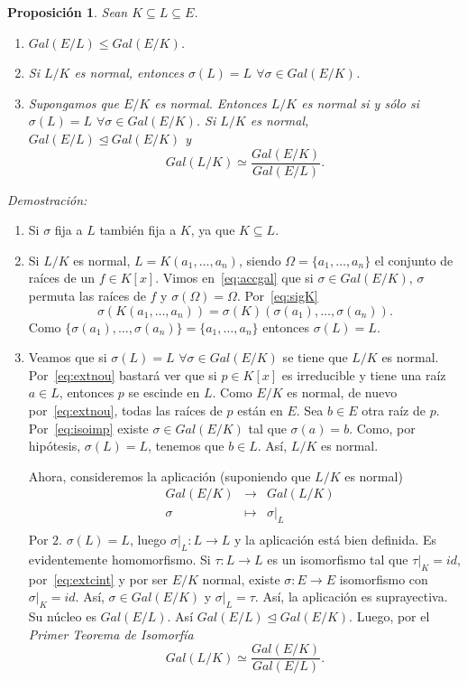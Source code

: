 \documentclass[12pt]{article}
\newtheorem{proposition}[theorem]{Proposición}
\begin{document}
\begin{proposition}\label{eq:preGal0} Sean $K \subseteq L \subseteq E$. \begin{enumerate}
\item $Gal(E/L) \leq Gal(E/K)$.
\item Si $L/K$ es normal, entonces $\sigma (L) = L$ $\forall \sigma \in Gal(E/K)$.
\item Supongamos que $E/K$ es normal. Entonces $L/K$ es normal si y sólo si $\sigma (L) = L$ $\forall \sigma \in Gal(E/K)$. Si $L/K$ es normal, $Gal(E/L) \unlhd Gal(E/K)$ y $$Gal(L/K) \simeq \dfrac{Gal(E/K)}{Gal(E/L)}.$$
\end{enumerate}
\end{proposition}
\emph{Demostración: }\begin{enumerate}
\item Si $\sigma$ fija a $L$ también fija a $K$, ya que $K \subseteq L$.
\item Si $L/K$ es normal, $L = K(a_{1}, \ldots, a_{n})$, siendo $\Omega = \lbrace a_{1}, \ldots, a_{n} \rbrace $ el conjunto de raíces de un $f \in K[x]$. Vimos en~\ref{eq:accgal} que si $\sigma \in Gal(E/K)$, $\sigma$ permuta las raíces de $f$ y $\sigma(\Omega) = \Omega$. Por~\ref{eq:sigK} $$\sigma(K(a_{1}, \ldots, a_{n})) = \sigma(K)(\sigma(a_{1}), \ldots, \sigma(a_{n})).$$ Como $\lbrace \sigma(a_{1}), \ldots, \sigma(a_{n}) \rbrace = \lbrace a_{1}, \ldots, a_{n} \rbrace$ entonces $\sigma(L) = L$.
\item Veamos que si $\sigma(L) = L$ $\forall \sigma \in Gal(E/K)$ se tiene que $L/K$ es normal. Por~\ref{eq:extnou} bastará ver que si $p \in K[x]$ es irreducible y tiene una raíz $a \in L$, entonces $p$ se escinde en $L$. Como $E/K$ es normal, de nuevo por~\ref{eq:extnou}, todas las raíces de $p$ están en $E$. Sea $b \in E$ otra raíz de $p$. Por~\ref{eq:isoimp} existe $\sigma \in Gal(E/K)$ tal que $\sigma (a) = b$. Como, por hipótesis, $\sigma (L) = L$, tenemos que $b \in L$. Así, $L/K$ es normal.

Ahora, consideremos la aplicación (suponiendo que $L/K$ es normal) $$\begin{array}{rccl}
&Gal(E/K)&\longrightarrow &Gal(L/K) \\
&\sigma& \longmapsto &\left.\sigma \right|_L \\
\end{array}
$$
Por $2.$ $\sigma(L) = L$, luego $\left.\sigma \right|_L \colon L \longrightarrow L$ y la aplicación está bien definida. Es evidentemente homomorfismo. Si $\tau \colon L \longrightarrow L$ es un isomorfismo tal que $\left.\tau \right|_K=id$, por~\ref{eq:extcint} y por ser $E/K$ normal, existe $\sigma \colon E \longrightarrow E$ isomorfismo con $\left.\sigma \right|_K = id$. Así, $\sigma \in Gal (E/K)$ y $\left.\sigma \right|_L = \tau$. Así, la aplicación  es suprayectiva. Su núcleo es $Gal(E/L)$. Así $Gal(E/L) \unlhd Gal(E/K).$ Luego, por el \textit{Primer Teorema de Isomorfía} $$Gal(L/K) \simeq \dfrac{Gal(E/K)}{Gal(E/L)}.$$
\end{enumerate}
\end{document}

